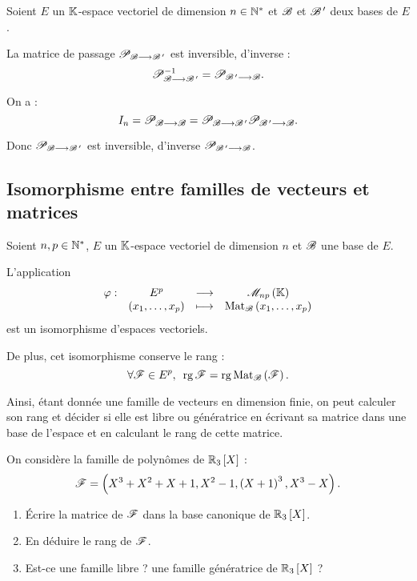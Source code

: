 \begin{prop}
Soient \(E\) un \(\mathbb{K}\)-espace vectoriel de dimension \(n\in\mathbb{N}^*\) et \(\mathscr{B}\) et \(\mathscr{B}^{\,\prime}\) deux bases de \(E\).

La matrice de passage \(\mathscr{P}_{\mathscr{B}\longrightarrow\mathscr{B}^{\,\prime}}\) est inversible, d'inverse : \[\mathscr{P}_{\mathscr{B}\longrightarrow\mathscr{B}^{\,\prime}}^{-1}=\mathscr{P}_{\mathscr{B}^{\,\prime}\longrightarrow\mathscr{B}}.\]
\end{prop}

\begin{dem}
On a : \[I_n=\mathscr{P}_{\mathscr{B}\longrightarrow\mathscr{B}}=\mathscr{P}_{\mathscr{B}\longrightarrow\mathscr{B}^{\,\prime}}\mathscr{P}_{\mathscr{B}^{\,\prime}\longrightarrow\mathscr{B}}.\]

Donc \(\mathscr{P}_{\mathscr{B}\longrightarrow\mathscr{B}^{\,\prime}}\) est inversible, d'inverse \(\mathscr{P}_{\mathscr{B}^{\,\prime}\longrightarrow\mathscr{B}}\).
\end{dem}

\subsection{Isomorphisme entre familles de vecteurs et matrices}

\begin{prop}
Soient \(n,p\in\mathbb{N}^*\), \(E\) un \(\mathbb{K}\)-espace vectoriel de dimension \(n\) et \(\mathscr{B}\) une base de \(E\).

L'application \[\fonction{\phi}{E^p}{\M{np}}{\paren{x_1,\dots,x_p}}{\Mat{x_1,\dots,x_p}}\] est un isomorphisme d'espaces vectoriels.

De plus, cet isomorphisme conserve le rang : \[\quantifs{\forall\fami{F}\in E^p}\rg\fami{F}=\rg\Mat{\fami{F}}.\]

Ainsi, étant donnée une famille de vecteurs en dimension finie, on peut calculer son rang et décider si elle est libre ou génératrice en écrivant sa matrice dans une base de l'espace et en calculant le rang de cette matrice.
\end{prop}

\begin{exoex}
On considère la famille de polynômes de \(\polydeg[\R]{3}\) : \[\mathscr{F}=\left(X^3+X^2+X+1,X^2-1,\left(X+1\right)^3,X^3-X\right).\]

\begin{enumerate}
    \item Écrire la matrice de \(\mathscr{F}\) dans la base canonique de \(\polydeg[\R]{3}\). \\
    \item En déduire le rang de \(\mathscr{F}\). \\
    \item Est-ce une famille libre ? une famille génératrice de \(\polydeg[\R]{3}\) ?
\end{enumerate}
\end{exoex}

